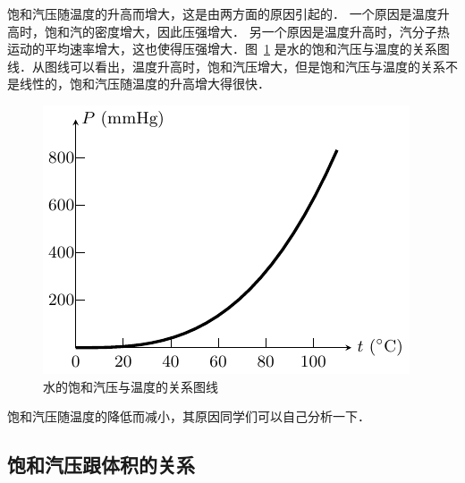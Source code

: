 饱和汽压随温度的升高而增大，这是由两方面的原因引起的．
一个原因是温度升高时，饱和汽的密度增大，因此压强增大．
另一个原因是温度升高时，汽分子热运动的平均速率增大，这也使得压强增大．图~\ref{fig_B_5-4} 是水的饱和汽压与温度的关系图线．从图线可以看出，温度升高时，饱和汽压增大，但是饱和汽压与温度的关系不是线性的，饱和汽压随温度的升高增大得很快．
\begin{figure}[htbp]
  \centering
  \includegraphics{fig/B/5-4.pdf}
  \caption{水的饱和汽压与温度的关系图线}\label{fig_B_5-4}
\end{figure}

饱和汽压随温度的降低而减小，其原因同学们可以自己分析一下．

\subsection{饱和汽压跟体积的关系} 

